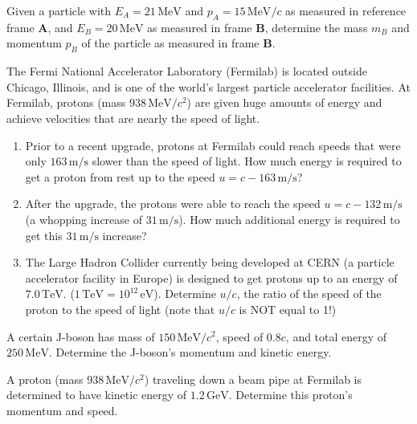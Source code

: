 \begin{exercise}
Given a particle with $E_A = 21\,\text{MeV}$ and $p_A
= 15\,\text{MeV}/c$ as measured in reference frame \textbf{A}, and 
$E_B = 20\,\text{MeV}$ as measured in frame \textbf{B}, determine the 
mass $m_B$ and momentum $p_B$ of the particle as measured in 
frame \textbf{B}.  
\end{exercise}

\begin{exercise}
The Fermi National Accelerator Laboratory (Fermilab) is located outside
Chicago, Illinois, and is one of the world's largest particle accelerator
facilities.  At Fermilab, protons (mass $938\,\text{MeV}/c^2$) are given
huge amounts of energy and achieve velocities that are nearly the speed
of light.
\begin{enumerate}
\item Prior to a recent upgrade, protons at Fermilab could reach
speeds that were only $163\,\text{m/s}$ slower than the speed of
light.  How much energy is required to get a proton from rest up to
the speed $u = c - 163\,\text{m/s}$?  
\item After the upgrade, the protons were able to reach the speed $u
=c - 132\,\text{m/s}$ (a whopping increase of $31\,\text{m/s}$).
How much additional energy is required to get this $31\,\text{m/s}$
increase?
\item The Large Hadron Collider currently being developed at CERN (a
  particle accelerator facility in Europe) is designed to get protons
  up to an energy of $7.0\,\text{TeV}$. ($1\,\text{TeV} =
  10^{12}\,\text{eV}$).  Determine $u/c$, the ratio of the speed of the
  proton to the speed of light (note that $u/c$ is NOT equal to 1!)
\end{enumerate}
\label{prob:fermilab}
\end{exercise}

\begin{exercise}
A certain J-boson has mass of $150\,\text{MeV}/c^2$, speed of
$0.8c$, and total energy of $250\,\text{MeV}$.  Determine
the J-boson's momentum and kinetic energy.
\label{prob:J}
\end{exercise}

\begin{exercise}
A proton (mass $938\,\text{MeV}/c^2$) traveling down a beam pipe at
Fermilab is determined to have kinetic energy of $1.2\,\text{GeV}$.
Determine this proton's momentum and speed.
\label{prob:fermilab2}
\end{exercise}


